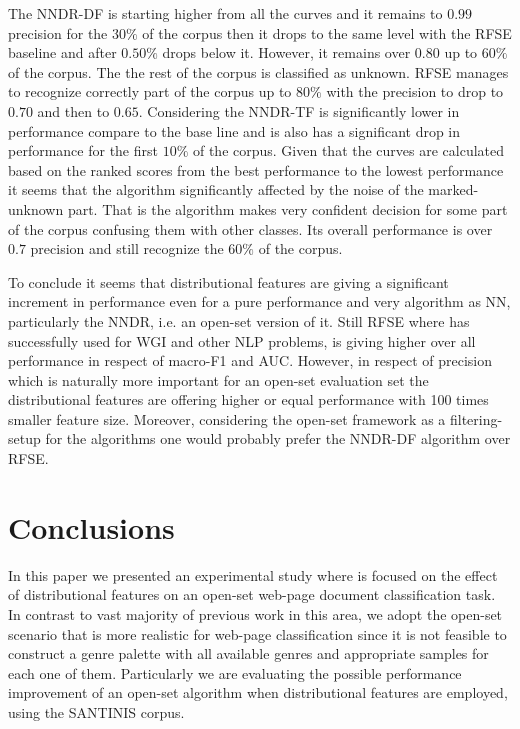 The NNDR-DF is starting higher from all the curves and it remains to $0.99$ precision for the $30\%$ of the corpus then it drops to the same level with the RFSE baseline and after $0.50\%$ drops below it. However, it remains over $0.80$ up to $60\%$ of the corpus. The the rest of the corpus is classified as unknown. RFSE manages to recognize correctly part of the corpus up to $80\%$ with the precision to drop to $0.70$ and then to $0.65$. Considering the NNDR-TF is significantly lower in performance compare to the base line and is also has a significant drop in performance for the first $10\%$ of the corpus. Given that the curves are calculated based on the ranked scores from the best performance to the lowest performance it seems that the algorithm significantly affected by the noise of the marked-unknown part. That is the algorithm makes very confident decision for some part of the corpus confusing them with other classes. Its overall performance is over $0.7$ precision and still recognize the $60\%$ of the corpus.

To conclude it seems that distributional features are giving a significant increment in performance even for a pure performance and very algorithm as NN, particularly the NNDR, i.e. an open-set version of it. Still RFSE where has successfully used for  WGI and other NLP problems, is giving higher over all performance in respect of macro-F1 and AUC. However, in respect of precision which is naturally more important for an open-set evaluation set the distributional features are offering higher or equal performance with 100 times smaller feature size. Moreover, considering the open-set framework as a filtering-setup for the algorithms one would probably prefer the NNDR-DF algorithm over RFSE.

\section{Conclusions}\label{sec:conclusions}

In this paper we presented an experimental study where is focused on the effect of distributional features on an open-set web-page document classification task. In contrast to vast majority of previous work in this area, we adopt the open-set scenario that is more realistic for  web-page classification since it is not feasible to construct a genre palette with all available genres and appropriate samples for each one of them. Particularly we are evaluating the possible performance improvement of an open-set algorithm when distributional features are employed, using the SANTINIS corpus.

